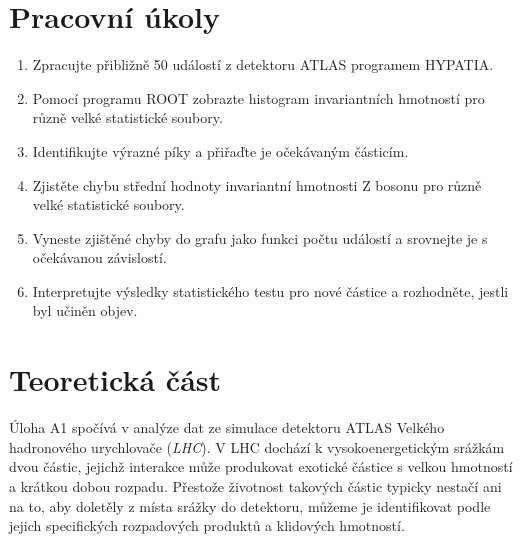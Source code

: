 \documentclass[10pt,a4paper]{article}
\newcommand{\°}{\degree}
\begin{document}

\setmainfont{Linux Libertine O}




\section{Pracovní úkoly}
\begin{enumerate}

    \item Zpracujte přibližně 50 událostí z detektoru ATLAS programem HYPATIA.
    \item Pomocí programu ROOT zobrazte histogram invariantních hmotností pro různě velké statistické soubory.
    \item Identifikujte výrazné píky a přiřaďte je očekávaným částicím.
    \item Zjistěte chybu střední hodnoty invariantní hmotnosti Z bosonu pro různě velké statistické soubory.
    \item Vyneste zjištěné chyby do grafu jako funkci počtu událostí a srovnejte je s očekávanou závislostí.
    \item Interpretujte výsledky statistického testu pro nové částice a rozhodněte, jestli byl učiněn objev.

\end{enumerate}

\section{Teoretická část}
Úloha A1 spočívá v analýze dat ze simulace detektoru ATLAS Velkého hadronového urychlovače (\textit{LHC}). V LHC dochází k vysokoenergetickým srážkám dvou částic, jejichž interakce může produkovat exotické částice s velkou hmotností a krátkou dobou rozpadu. Přestože životnost takových částic typicky nestačí ani na to, aby doletěly z místa srážky do detektoru, můžeme je identifikovat podle jejich specifických rozpadových produktů a klidových hmotností.
\end{document}
